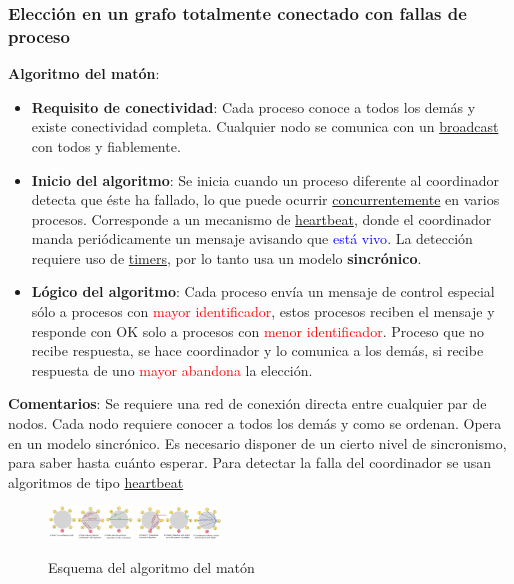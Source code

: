 \subsubsection{Elección en un grafo totalmente conectado con fallas de proceso}

\textbf{Algoritmo del matón}:

\begin{itemize}
    \item \textbf{Requisito de conectividad}: Cada proceso conoce a todos los demás y existe conectividad completa. Cualquier nodo se comunica con un \underline{broadcast} con todos y fiablemente.

    \item \textbf{Inicio del algoritmo}: Se inicia cuando un proceso diferente al coordinador detecta que éste ha fallado, lo que puede ocurrir \underline{concurrentemente} en varios procesos. Corresponde a un mecanismo de \underline{heartbeat}, donde el coordinador manda periódicamente un mensaje avisando que \textcolor{blue}{está vivo}. La detección requiere uso de \underline{timers}, por lo tanto usa un modelo \textbf{sincrónico}.

    \item \textbf{Lógico del algoritmo}: Cada proceso envía un mensaje de control especial sólo a procesos con \textcolor{red}{mayor identificador}, estos procesos reciben el mensaje y responde con OK solo a procesos con \textcolor{red}{menor identificador}. Proceso que no recibe respuesta, se hace coordinador y lo comunica a los demás, si recibe respuesta de uno \textcolor{red}{mayor abandona} la elección.
\end{itemize}

\textbf{Comentarios}: Se requiere una red de conexión directa entre cualquier par de nodos. Cada nodo requiere conocer a todos los demás y como se ordenan. Opera en un modelo sincrónico. Es necesario disponer de un cierto nivel de sincronismo, para saber hasta cuánto esperar. Para detectar la falla del coordinador se usan algoritmos de tipo \underline{heartbeat}

\begin{figure}[H]
    \centering
    \includegraphics[width=0.2\textwidth]{img/Bully_1.png}
    \includegraphics[width=0.2\textwidth]{img/Bully_2.png}
    \caption{Esquema del algoritmo del matón}
    
\end{figure}

